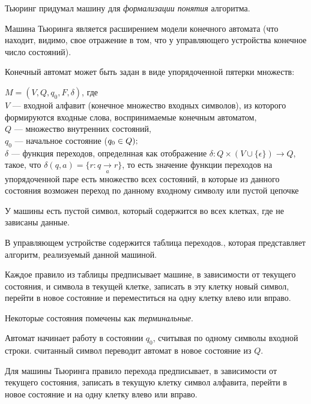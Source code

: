 \documentclass{article}
\begin{document}

Тьюринг придумал машину для \textit{формализации понятия} алгоритма.

Машина Тьюринга является расширением модели конечного автомата (что находит, видимо, свое отражение в том, что у управляющего устройства конечное число состояний).

Конечный автомат может быть задан в виде упорядоченной пятерки множеств:

$M = (V, Q, q_0, F, \delta)$, где\\
$V$ --- входной алфавит (конечное множество входных символов), из которого формируются входные слова, воспринимаемые конечным автоматом,\\
$Q$ --- множество внутренних состояний,\\
$q_0$ --- начальное состояние ($q_0 \in Q);\\
$\\
$\delta$ --- функция переходов, определнная как отображение $\delta:Q\times(V\cup\{\epsilon\})\to Q$, такое, что $\delta(q,a)=\{r:q\underset{a}{\to} r\}$, то есть значение функции переходов на упорядоченной паре есть множество всех состояний, в которые из данного состояния возможен переход по данному входному символу или пустой цепочке

У машины есть пустой символ, который содержится во всех клетках, где не зависаны данные.

В управляющем устройстве содержится таблица переходов., которая представляет алгоритм, реализуемый данной машиной.

Каждое правило из таблицы предписывает машине, в зависимости от текущего состояния, и символа в текущей клетке, записать в эту клетку новый символ, перейти в новое состояние и переместиться на одну клетку влево или вправо.

Некоторые состояния помечены как \textit{терминальные}. 

Автомат начинает работу в состоянии $q_0$, считывая по одному символы входной строки. считанный символ переводит автомат в новое состояние из $Q$. 

Для машины Тьюринга правило перехода предписывает, в зависимости от текущего состояния, записать в текущую клетку символ алфавита, перейти в новое состояние и на одну клетку влево или вправо.
\end{document}
